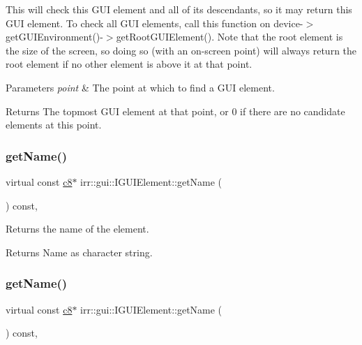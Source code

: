 This will check this G\+UI element and all of its descendants, so it may return this G\+UI element. To check all G\+UI elements, call this function on device-\/$>$get\+G\+U\+I\+Environment()-\/$>$get\+Root\+G\+U\+I\+Element(). Note that the root element is the size of the screen, so doing so (with an on-\/screen point) will always return the root element if no other element is above it at that point. 
\begin{DoxyParams}{Parameters}
{\em point} & The point at which to find a G\+UI element. \\
\hline
\end{DoxyParams}
\begin{DoxyReturn}{Returns}
The topmost G\+UI element at that point, or 0 if there are no candidate elements at this point. 
\end{DoxyReturn}
\mbox{\label{classirr_1_1gui_1_1IGUIElement_a308fa8bc16580d53df5c65ded0c1349b}} 
\subsubsection{\texorpdfstring{get\+Name()}{getName()}\hspace{0.1cm}{\footnotesize\ttfamily [1/2]}}
{\footnotesize\ttfamily virtual const \hyperlink{namespaceirr_a9395eaea339bcb546b319e9c96bf7410}{c8}$\ast$ irr\+::gui\+::\+I\+G\+U\+I\+Element\+::get\+Name (\begin{DoxyParamCaption}{ }\end{DoxyParamCaption}) const\hspace{0.3cm}{\ttfamily [inline]}, {\ttfamily [virtual]}}



Returns the name of the element. 

\begin{DoxyReturn}{Returns}
Name as character string. 
\end{DoxyReturn}
\mbox{\label{classirr_1_1gui_1_1IGUIElement_a308fa8bc16580d53df5c65ded0c1349b}} 
\subsubsection{\texorpdfstring{get\+Name()}{getName()}\hspace{0.1cm}{\footnotesize\ttfamily [2/2]}}
{\footnotesize\ttfamily virtual const \hyperlink{namespaceirr_a9395eaea339bcb546b319e9c96bf7410}{c8}$\ast$ irr\+::gui\+::\+I\+G\+U\+I\+Element\+::get\+Name (\begin{DoxyParamCaption}{ }\end{DoxyParamCaption}) const\hspace{0.3cm}{\ttfamily [inline]}, {\ttfamily [virtual]}}



